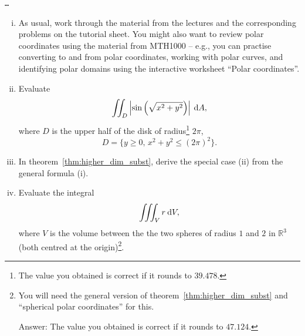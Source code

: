 \begin{application}
\texttt{\ldots}
\end{application}

\begin{exercise}
\begin{enumerate}[(i)]
	\item As usual, work through the material from the lectures and the corresponding problems on the tutorial sheet. You might also want to review polar coordinates using the material from MTH1000 -- e.g., you can practise converting to and from polar coordinates, working with polar curves, and identifying polar domains using the interactive worksheet ``Polar coordinates''.
	\item Evaluate
	\[ \iint_D \left| \sin\left( \sqrt{x^2+y^2} \right) \right| \: \mathrm{d} A, \]
	where $D$ is the upper half of the disk of radius\footnote{The value you obtained is correct if it rounds to $39.478$.} $2\pi$,
	\[ D = \{ y \geq 0, \, x^2 + y^2 \leq (2\pi)^2 \}. \]
	\item In theorem~\ref{thm:higher_dim_subst}, derive the special case (ii) from the general formula (i).
	\item Evaluate the integral
	\[ \iiint_V r \: \mathrm{d} V, \]
	where $V$ is the volume between the the two spheres of radius $1$ and $2$ in $\mathbb{R}^3$ (both centred at the origin)\footnote{You will need the general version of theorem~\ref{thm:higher_dim_subst} and ``spherical polar coordinates'' for this.
		
	Answer: The value you obtained is correct if it rounds to $47.124$.}.
\end{enumerate}
\end{exercise}